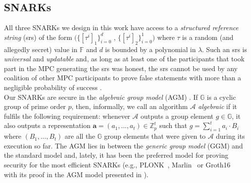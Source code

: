\subsection{SNARKs}
\label{sec:snarks_defs}

\noindent All three SNARKs we design in this work have access to a \emph{structured reference string} (srs) of the form 
$(\{[\tau^i]_1\}_{i=0}^{d}$ , $\{[\tau^i]_2\}_{i=0}^{1})$ where $\tau$ is a random (and allegedly secret) value in $\mathbb{F}$ and $d$ 
is bounded by a polynomial in $\lambda$. Such an srs is \emph{universal} and \emph{updatable} \cite{updatable_universal_srs_2018} and, 
as long as at least one of the participants that took part in the MPC generating the srs was honest, the srs cannot be used by 
any coalition of other MPC participants to prove false statements with more than a negligible probability of 
success \cite{updatable_universal_srs_2018,ariel_MPC_SRS_2017}. \\

\noindent Our SNARKs are secure in the \emph{algebraic group model} (AGM) \cite{AGM_model}. 
If $\mathbb{G}$ is a cyclic group of prime order $p$, then, informally, we call an algorithm $\mathcal{A}$ \emph{algebraic} if it
fulfils the following requirement: whenever $\mathcal{A}$ outputs a group element $g \in  \mathbb{G}$, 
it also outputs a representation $\mathbf{a} = (a_1, . . . , a_t) \in \mathbb{Z}_p^t$ such that $g = \sum_{i=1}^{t} a_i \cdot B_i$
where $(B_1, \ldots, B_t )$ are all the $\mathbb{G}$ group elements that were given to $\mathcal{A}$ during its execution so far. 
The AGM lies in between the \emph{generic group model} (GGM) \cite{GGM_model1, GGM_model2} and the standard model and, 
lately, it has been the preferred model for proving security for the most efficient SNARKs 
(e.g., PLONK~\cite{plonk}, Marlin~\cite{marlin} or Groth16~\cite{groth16} with its proof in the AGM model 
presented in \cite{AGM_model, another_extractable_groth16}). \\

